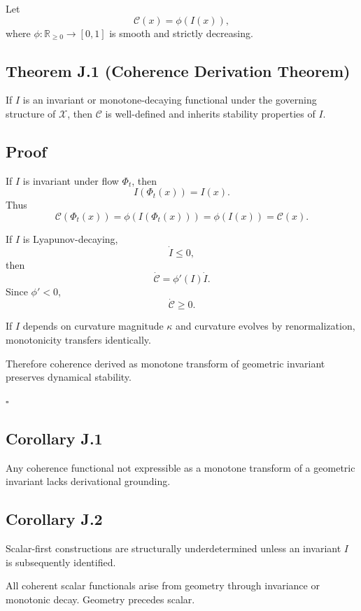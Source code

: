 \documentclass[12pt]{article}
\begin{document}
Let
\[
\mathcal{C}(x)
=
\phi(I(x)),
\]
where $\phi : \mathbb{R}_{\ge 0} \to [0,1]$ is smooth and strictly decreasing.

\subsection*{Theorem J.1 (Coherence Derivation Theorem)}

If $I$ is an invariant or monotone-decaying functional under the governing structure of $\mathcal{X}$, then $\mathcal{C}$ is well-defined and inherits stability properties of $I$.

\subsection*{Proof}

If $I$ is invariant under flow $\Phi_t$, then
\[
I(\Phi_t(x)) = I(x).
\]
Thus
\[
\mathcal{C}(\Phi_t(x))
=
\phi(I(\Phi_t(x)))
=
\phi(I(x))
=
\mathcal{C}(x).
\]

If $I$ is Lyapunov-decaying,
\[
\dot{I} \le 0,
\]
then
\[
\dot{\mathcal{C}}
=
\phi'(I)\dot{I}.
\]
Since $\phi' < 0$,
\[
\dot{\mathcal{C}} \ge 0.
\]

If $I$ depends on curvature magnitude $\kappa$ and curvature evolves by renormalization,
monotonicity transfers identically.

Therefore coherence derived as monotone transform of geometric invariant preserves dynamical stability.

\hfill $\square$

\subsection*{Corollary J.1}

Any coherence functional not expressible as a monotone transform of a geometric invariant lacks derivational grounding.

\subsection*{Corollary J.2}

Scalar-first constructions are structurally underdetermined unless an invariant $I$ is subsequently identified.

All coherent scalar functionals arise from geometry through invariance or monotonic decay. Geometry precedes scalar.

\smallskip
\end{document}
